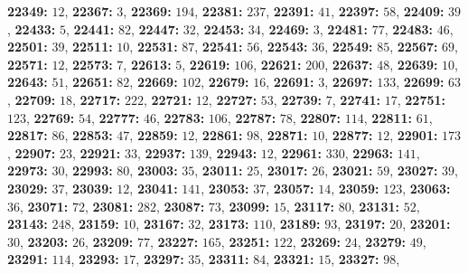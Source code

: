 \textsf{\bfseries 22349:} $12$, \textsf{\bfseries 22367:} $3$, \textsf{\bfseries 22369:} $194$, \textsf{\bfseries 22381:} $237$, \textsf{\bfseries 22391:} $41$, \textsf{\bfseries 22397:} $58$, \textsf{\bfseries 22409:} $39$, \textsf{\bfseries 22433:} $5$, \textsf{\bfseries 22441:} $82$, \textsf{\bfseries 22447:} $32$, \textsf{\bfseries 22453:} $34$, \textsf{\bfseries 22469:} $3$, \textsf{\bfseries 22481:} $77$, \textsf{\bfseries 22483:} $46$, \textsf{\bfseries 22501:} $39$, \textsf{\bfseries 22511:} $10$, \textsf{\bfseries 22531:} $87$, \textsf{\bfseries 22541:} $56$, \textsf{\bfseries 22543:} $36$, \textsf{\bfseries 22549:} $85$, \textsf{\bfseries 22567:} $69$, \textsf{\bfseries 22571:} $12$, \textsf{\bfseries 22573:} $7$, \textsf{\bfseries 22613:} $5$, \textsf{\bfseries 22619:} $106$, \textsf{\bfseries 22621:} $200$, \textsf{\bfseries 22637:} $48$, \textsf{\bfseries 22639:} $10$, \textsf{\bfseries 22643:} $51$, \textsf{\bfseries 22651:} $82$, \textsf{\bfseries 22669:} $102$, \textsf{\bfseries 22679:} $16$, \textsf{\bfseries 22691:} $3$, \textsf{\bfseries 22697:} $133$, \textsf{\bfseries 22699:} $63$, \textsf{\bfseries 22709:} $18$, \textsf{\bfseries 22717:} $222$, \textsf{\bfseries 22721:} $12$, \textsf{\bfseries 22727:} $53$, \textsf{\bfseries 22739:} $7$, \textsf{\bfseries 22741:} $17$, \textsf{\bfseries 22751:} $123$, \textsf{\bfseries 22769:} $54$, \textsf{\bfseries 22777:} $46$, \textsf{\bfseries 22783:} $106$, \textsf{\bfseries 22787:} $78$, \textsf{\bfseries 22807:} $114$, \textsf{\bfseries 22811:} $61$, \textsf{\bfseries 22817:} $86$, \textsf{\bfseries 22853:} $47$, \textsf{\bfseries 22859:} $12$, \textsf{\bfseries 22861:} $98$, \textsf{\bfseries 22871:} $10$, \textsf{\bfseries 22877:} $12$, \textsf{\bfseries 22901:} $173$, \textsf{\bfseries 22907:} $23$, \textsf{\bfseries 22921:} $33$, \textsf{\bfseries 22937:} $139$, \textsf{\bfseries 22943:} $12$, \textsf{\bfseries 22961:} $330$, \textsf{\bfseries 22963:} $141$, \textsf{\bfseries 22973:} $30$, \textsf{\bfseries 22993:} $80$, \textsf{\bfseries 23003:} $35$, \textsf{\bfseries 23011:} $25$, \textsf{\bfseries 23017:} $26$, \textsf{\bfseries 23021:} $59$, \textsf{\bfseries 23027:} $39$, \textsf{\bfseries 23029:} $37$, \textsf{\bfseries 23039:} $12$, \textsf{\bfseries 23041:} $141$, \textsf{\bfseries 23053:} $37$, \textsf{\bfseries 23057:} $14$, \textsf{\bfseries 23059:} $123$, \textsf{\bfseries 23063:} $36$, \textsf{\bfseries 23071:} $72$, \textsf{\bfseries 23081:} $282$, \textsf{\bfseries 23087:} $73$, \textsf{\bfseries 23099:} $15$, \textsf{\bfseries 23117:} $80$, \textsf{\bfseries 23131:} $52$, \textsf{\bfseries 23143:} $248$, \textsf{\bfseries 23159:} $10$, \textsf{\bfseries 23167:} $32$, \textsf{\bfseries 23173:} $110$, \textsf{\bfseries 23189:} $93$, \textsf{\bfseries 23197:} $20$, \textsf{\bfseries 23201:} $30$, \textsf{\bfseries 23203:} $26$, \textsf{\bfseries 23209:} $77$, \textsf{\bfseries 23227:} $165$, \textsf{\bfseries 23251:} $122$, \textsf{\bfseries 23269:} $24$, \textsf{\bfseries 23279:} $49$, \textsf{\bfseries 23291:} $114$, \textsf{\bfseries 23293:} $17$, \textsf{\bfseries 23297:} $35$, \textsf{\bfseries 23311:} $84$, \textsf{\bfseries 23321:} $15$, \textsf{\bfseries 23327:} $98$, 
